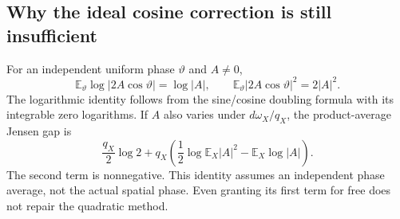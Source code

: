 \subsection{Why the ideal cosine correction is still insufficient}
For an independent uniform phase \(\vartheta\) and \(A\ne0\),
\[
 \mathbb E_\vartheta\log|2A\cos\vartheta|=\log|A|,
 \qquad \mathbb E_\vartheta|2A\cos\vartheta|^2=2|A|^2.
\]
The logarithmic identity follows from the sine/cosine doubling
formula with its integrable zero logarithms. If \(A\) also varies
under \(d\omega_X/q_X\), the product-average Jensen gap is
\begin{equation}\label{eq:phase-amplitude-gap}
 \frac{q_X}{2}\log2+
 q_X\left(\frac12\log\mathbb E_X|A|^2-\mathbb E_X\log|A|\right).
\end{equation}
The second term is nonnegative. This identity assumes an independent
phase average, not the actual spatial phase. Even granting its first
term for free does not repair the quadratic method.

